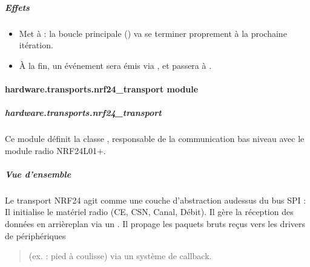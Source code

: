 \documentclass[letterpaper,10pt,french]{sphinxmanual}
\begin{document}
\begin{fulllineitems}
\begin{fulllineitems}
\subparagraph{Effets}
\label{\detokenize{api/hardware.transports:effets}}\begin{itemize}
\item {} 
\sphinxAtStartPar
Met  à  : la boucle principale () va
se terminer proprement à la prochaine itération.

\item {} 
\sphinxAtStartPar
À la fin, un événement  sera émis via , et
 passera à .

\end{itemize}

\end{fulllineitems}


\end{fulllineitems}



\paragraph{hardware.transports.nrf24\_transport module}
\label{\detokenize{api/hardware.transports:module-hardware.transports.nrf24_transport}}\label{\detokenize{api/hardware.transports:hardware-transports-nrf24-transport-module}}

\subparagraph{hardware.transports.nrf24\_transport}
\label{\detokenize{api/hardware.transports:hardware-transports-nrf24-transport}}
\sphinxAtStartPar
Ce module définit la classe , responsable de la communication
bas niveau avec le module radio NRF24L01+.


\subparagraph{Vue d’ensemble}
\label{\detokenize{api/hardware.transports:vue-d-ensemble}}
\sphinxAtStartPar
Le transport NRF24 agit comme une couche d’abstraction au\sphinxhyphen{}dessus du bus SPI :
\sphinxhyphen{} Il initialise le matériel radio (CE, CSN, Canal, Débit).
\sphinxhyphen{} Il gère la réception des données en arrière\sphinxhyphen{}plan via un .
\sphinxhyphen{} Il propage les paquets bruts reçus vers les drivers de périphériques
\begin{quote}

\sphinxAtStartPar
(ex. : pied à coulisse) via un système de callback.
\end{quote}
\end{document}
